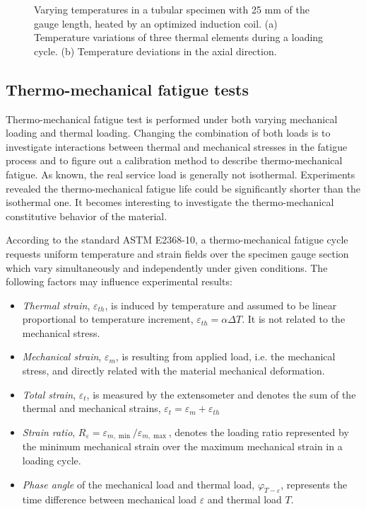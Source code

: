 \documentclass[preprint,5p,twocolumn,11pt,sort&compress]{elsarticle}
\begin{document}
\begin{figure*}
\caption{Varying temperatures in a tubular specimen with 25 mm of the gauge length, heated by an optimized induction coil. (a) Temperature variations of three thermal elements during a loading cycle. (b) Temperature deviations in the axial direction. }
\label{Fig:thermal_stability}
\end{figure*}


\subsection{Thermo-mechanical fatigue tests}
\noindent
Thermo-mechanical fatigue test is performed under both varying mechanical loading and thermal loading.
Changing the combination of both loads is to investigate interactions between thermal and mechanical stresses in the fatigue process and to figure out a calibration method to describe thermo-mechanical fatigue. As known, the real service load is generally not isothermal. Experiments revealed the thermo-mechanical fatigue life could be significantly shorter than the isothermal one. It becomes interesting to investigate the thermo-mechanical constitutive behavior of the material.

According to the standard ASTM E2368-10, a thermo-mechanical fatigue cycle requests uniform temperature and strain fields over the specimen gauge section which vary simultaneously and independently under given conditions. The following factors may influence experimental results:
\begin{itemize}
  \item {\em Thermal strain}, $\varepsilon_{th}$, is induced by temperature and assumed to be linear proportional to temperature increment, $\varepsilon_{th}=\alpha \Delta T$.  It is not related to the mechanical stress.
  \item {\em Mechanical strain}, $\varepsilon_{m}$, is resulting from applied load, i.e. the mechanical stress, and directly related with the material mechanical deformation.
  \item {\em Total strain}, $\varepsilon_t$, is measured by the extensometer and denotes the sum of the thermal and mechanical strains, $\varepsilon_t=\varepsilon_m+\varepsilon_{th}$
  \item {\em Strain ratio}, $ R_{\varepsilon}=\varepsilon_{m,\min}/\varepsilon_{m,\max}$, denotes the loading ratio represented by the minimum mechanical strain over the maximum mechanical strain in a loading cycle.
  \item {\em Phase angle} of the mechanical load and thermal load, $\varphi_{T-\varepsilon}$, represents the time difference between mechanical load $\varepsilon$ and thermal load $T$.
\end{itemize}
\end{document}
